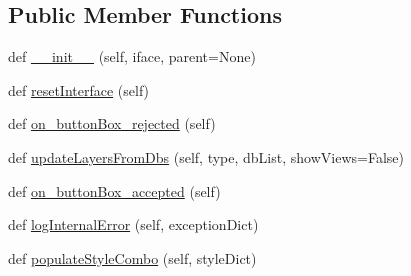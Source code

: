 \subsection*{Public Member Functions}
\begin{DoxyCompactItemize}
\item 
def \mbox{\hyperlink{class_dsg_tools_1_1_layer_tools_1_1_load_layers_from_server_1_1load_layers_from_server_1_1_load_layers_from_server_a79aba09639e794c491a9bfeb3df55d35}{\+\_\+\+\_\+init\+\_\+\+\_\+}} (self, iface, parent=None)
\item 
def \mbox{\hyperlink{class_dsg_tools_1_1_layer_tools_1_1_load_layers_from_server_1_1load_layers_from_server_1_1_load_layers_from_server_a46e887979f70b98f488e3b0aef33c214}{reset\+Interface}} (self)
\item 
def \mbox{\hyperlink{class_dsg_tools_1_1_layer_tools_1_1_load_layers_from_server_1_1load_layers_from_server_1_1_load_layers_from_server_a54375e532c65753ec56787358a667cd7}{on\+\_\+button\+Box\+\_\+rejected}} (self)
\item 
def \mbox{\hyperlink{class_dsg_tools_1_1_layer_tools_1_1_load_layers_from_server_1_1load_layers_from_server_1_1_load_layers_from_server_a48c6d0c4e050cbc1d7b9d882b7c6facc}{update\+Layers\+From\+Dbs}} (self, type, db\+List, show\+Views=False)
\item 
def \mbox{\hyperlink{class_dsg_tools_1_1_layer_tools_1_1_load_layers_from_server_1_1load_layers_from_server_1_1_load_layers_from_server_ab6309a5f23be5931c1916c31ce8898ec}{on\+\_\+button\+Box\+\_\+accepted}} (self)
\item 
def \mbox{\hyperlink{class_dsg_tools_1_1_layer_tools_1_1_load_layers_from_server_1_1load_layers_from_server_1_1_load_layers_from_server_a1fdb8f1df376035c7a081ffdfa965a76}{log\+Internal\+Error}} (self, exception\+Dict)
\item 
def \mbox{\hyperlink{class_dsg_tools_1_1_layer_tools_1_1_load_layers_from_server_1_1load_layers_from_server_1_1_load_layers_from_server_a391c45effce3c8b0122adf2f10cd600b}{populate\+Style\+Combo}} (self, style\+Dict)
\end{DoxyCompactItemize}
